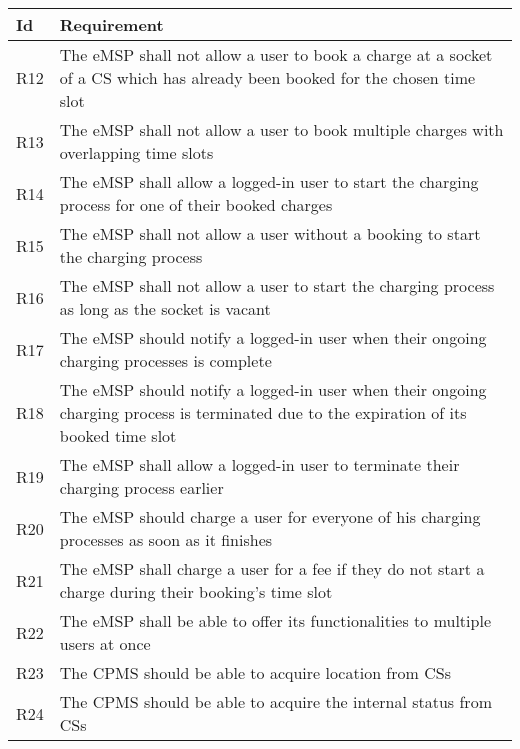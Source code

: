 \documentclass[11pt]{article}
\begin{document}
\begin{table}[H]
    \centering
    \setlength{\tabcolsep}{18pt}
    \renewcommand{\arraystretch}{1.2}
    \begin{tabularx}{\textwidth}{|>{\centering\hsize=0.1\hsize}X|>{\hsize=1.9\hsize}X|}
        \hline
        \textbf{Id} & \textbf{Requirement} \\
        \hline 
        R12 & The eMSP shall not allow a user to book a charge at a socket of a CS which has already been booked for the chosen time slot \\
        \hline
        R13 & The eMSP shall not allow a user to book multiple charges with overlapping time slots \\
        \hline
        R14 & The eMSP shall allow a logged-in user to start the charging process for one of their booked charges \\
        \hline
        R15 & The eMSP shall not allow a user without a booking to start the charging process \\
        \hline
        R16 & The eMSP shall not allow a user to start the charging process as long as the socket is vacant \\
        \hline
        R17 & The eMSP should notify a logged-in user when their ongoing charging processes is complete \\
        \hline
        R18 & The eMSP should notify a logged-in user when their ongoing charging process is terminated due to the expiration of its booked time slot \\
        \hline
        R19 & The eMSP shall allow a logged-in user to terminate their charging process earlier \\
        \hline
        R20 & The eMSP should charge a user for everyone of his charging processes as soon as it finishes \\
        \hline
        R21 & The eMSP shall charge a user for a fee if they do not start a charge during their booking's time slot \\
        \hline
        R22 & The eMSP shall be able to offer its functionalities to multiple users at once \\
        \hline
        R23 & The CPMS should be able to acquire location from CSs \\
        \hline
        R24 & The CPMS should be able to acquire the internal status from CSs \\

\end{tabularx}
\end{table}
\end{document}
